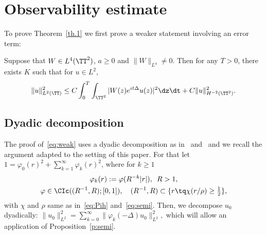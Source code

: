 \section{Observability estimate}\label{obs}

To prove Theorem~\ref{th.1} we first prove a weaker statement involving an error term:

\begin{prop}\label{p:weak}
Suppose that $ W \in L^4 (\TT^2) $, $ a \geq 0 $ and $ \| W \|_{ L^4 } \neq 0 $. Then for any $ T > 0 $, there exists $ K $ such that for $ u \in L^2 $,
\begin{equation}\label{eq:weak}
\| u \|_{ L^2 (\TT) }^2 \leq C \int_0^T \int_{\TT^2 } | W(z) e^{ i t \Delta } u (z) |^2 \dz \dt + C \| u \|^2_{ H^{-2} (\TT^2) }.
\end{equation}
\end{prop}

\subsection{Dyadic decomposition}\label{dya}
The proof of~\eqref{eq:weak} uses a dyadic decomposition as in~\cite[Section~5.1]{BBZ} and~\cite[Section~4]{BZ4} and we recall the argument adapted to the setting of this paper. For that let $ 1= \varphi_{0} (r)^2 + \sum_{k=1}^{\infty} \varphi_{k} (r)^2$, where for $ k \geq 1 $
\begin{gather*}
\varphi_{k} (r) := \varphi(R ^{-k} |r|), \enspace R > 1, \\ \varphi \in \CIc ((R^{-1}, R) ; [0, 1]), \quad (R^{-1}, R) \subset \{ r \tq \chi(r / \rho) \geq
\textstyle{\frac12} \},
\end{gather*}
with $ \chi $ and $ \rho $ same as in~\eqref{eq:Pih} and~\eqref{eq:semi}. Then, we decompose $u_0$ dyadically: $\|u_0 \|^2_{L^2} = \sum_{k=0}^\infty \|\varphi_{k}(- \Delta) u_0 \|_{L^2}^2, $ which will allow an application of Proposition~\ref{p:semi}.

